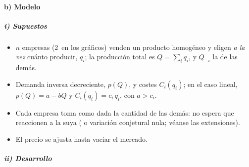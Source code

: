 \documentclass[11pt]{article}
\begin{document}
\paragraph{b) Modelo}

\subparagraph{i) Supuestos}

\begin{itemize}
\item $n$ empresas (2~en los gráficos) venden un producto homogéneo y eligen \emph{a la vez} cuánto producir, $q_i$; la producción total es $Q=\sum_iq_i$, y $Q_{-i}$ la de las demás.
\item Demanda inversa decreciente, $p(Q)$, y costes $C_i(q_i)$; en el caso lineal, $p(Q)=a-bQ$ y $C_i(q_i)=c_i\,q_i$, con $a>c_i$.
\item Cada empresa toma como dada la cantidad de las demás: no espera que reaccionen a la suya ( o variación conjetural nula; véanse las extensiones).
\item El precio se ajusta hasta vaciar el mercado.
\end{itemize}

\subparagraph{ii) Desarrollo}
\end{document}
